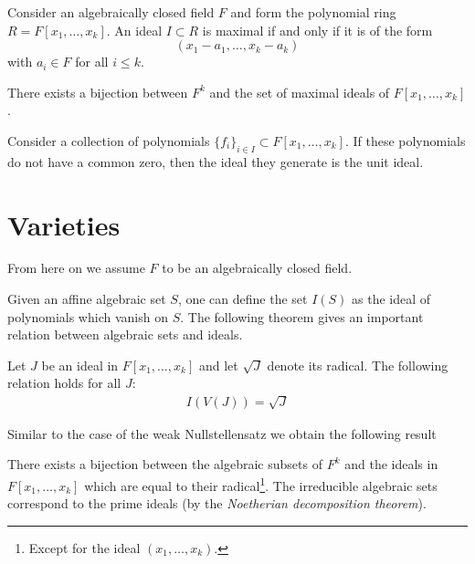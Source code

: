 	\begin{theorem}
		Consider an algebraically closed field $F$ and form the polynomial ring $R=F[x_1, \ldots, x_k]$. An ideal $I\subset R$ is maximal if and only if it is of the form \[(x_1-a_1, \ldots, x_k-a_k)\] with $a_i\in F$ for all $i\leq k$.
	\end{theorem}
	\begin{result}
		There exists a bijection between $F^k$ and the set of maximal ideals of $F[x_1, \ldots, x_k]$.
	\end{result}
	\begin{result}
		Consider a collection of polynomials $\{f_i\}_{i\in I}\subset F[x_1, \ldots, x_k]$. If these polynomials do not have a common zero, then the ideal they generate is the unit ideal.
	\end{result}
	
\section{Varieties}

	From here on we assume $F$ to be an algebraically closed field.

	
	Given an affine algebraic set $S$, one can define the set $I(S)$ as the ideal of polynomials which vanish on $S$. The following theorem gives an important relation between algebraic sets and ideals.
	\begin{theorem}
		Let $J$ be an ideal in $F[x_1, \ldots, x_k]$ and let $\sqrt{J}$ denote its radical. The following relation holds for all $J$:
		\begin{gather}
			I(V(J)) = \sqrt{J}
		\end{gather}
	\end{theorem}
	Similar to the case of the weak Nullstellensatz we obtain the following result
	\begin{result}
		There exists a bijection between the algebraic subsets of $F^k$ and the ideals in $F[x_1, \ldots, x_k]$ which are equal to their radical\footnote{Except for the ideal $(x_1, \ldots, x_k)$.}. The irreducible algebraic sets correspond to the prime ideals (by the \textit{Noetherian decomposition theorem}).
	\end{result}
	

